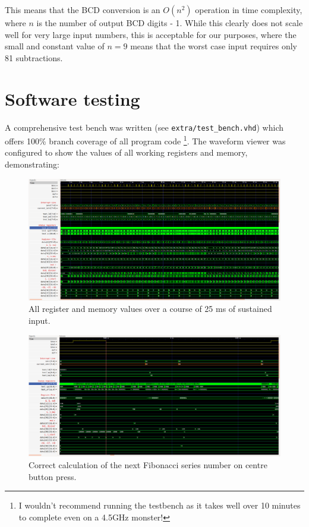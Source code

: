 \documentclass[12pt,a4paper]{article}
\begin{document}
\noindent
This means that the BCD conversion is an $O(n^2)$ operation in time
complexity, where $n$ is the number of output BCD digits - 1. While
this clearly does not scale well for very large input numbers, this is
acceptable for our purposes, where the small and constant value of $n
= 9$ means that the worst case input requires only 81 subtractions.

\section{Software testing}

A comprehensive test bench was written (see
\texttt{extra/test\_bench.vhd}) which offers 100\% branch coverage of
all program code \footnote{I wouldn't recommend running the testbench
  as it takes well over 10 minutes to complete even on a 4.5GHz
  monster!}. The waveform viewer was configured to show the values of
all working registers and memory, demonstrating:

\begin{figure}[H]
  \centering
  \includegraphics[width=7.2in]{assets/t0.png}
  \caption{All register and memory values over a course of 25 ms of
    sustained input.}
\end{figure}

\begin{figure}[H]
  \centering
  \includegraphics[width=7.2in]{assets/t1.png}
  \caption{Correct calculation of the next Fibonacci series number on
    centre button press.}
\end{figure}
\end{document}
